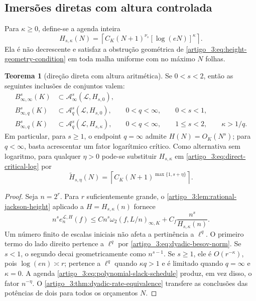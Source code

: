 \documentclass[12pt,a4paper]{article}
\theoremstyle{preciso}
\theoremstyle{definition}
\newcommand{\Library}{\mathcal{L}}
\theoremstyle{preciso}
\newtheorem{theorem}[teorema]{Teorema}
\theoremstyle{preciso}
\theoremstyle{preciso}
\theoremstyle{preciso}
\theoremstyle{definition}
\theoremstyle{preciso}
\theoremstyle{definition}
\theoremstyle{preciso}
\theoremstyle{preciso}
\theoremstyle{definition}
\begin{document}
\subsection{Imersões diretas com altura controlada}

Para $\kappa\ge0$, define-se a agenda inteira
\begin{equation}
 H_{s,\kappa}(N)
 =\left\lceil C_K(N+1)^{\nu_s}
        [\log(eN)]^\kappa\right\rceil.
 \label{artigo_3:eq:corrected-height-schedule}
\end{equation}
Ela é não decrescente e satisfaz a obstrução geométrica de
\eqref{artigo_3:eq:height-geometry-condition} em toda malha uniforme com no máximo
$N$ folhas.

\begin{theorem}[direção direta com altura aritmética]\label{map:artigo_3:4.2}
\label{artigo_3:thm:direct-besov-height}
Se $0<s<2$, então as seguintes inclusões de conjuntos valem:
\begin{align}
 B^s_{\infty,\infty}(K)
 &\subset
 \mathscr A^s_\infty(\Library,H_{s,0}),
 \label{artigo_3:eq:direct-endpoint}\\
 B^s_{\infty,q}(K)
 &\subset
 \mathscr A^s_q(\Library,H_{s,0}),
 &&0<q<\infty,\qquad 0<s<1,
 \label{artigo_3:eq:direct-subcritical}\\
 B^s_{\infty,q}(K)
 &\subset
 \mathscr A^s_q(\Library,H_{s,\kappa}),
 &&0<q<\infty,\qquad 1\le s<2,\qquad\kappa>1/q.
 \label{artigo_3:eq:direct-critical-log}
\end{align}
Em particular, para $s\ge1$, o endpoint $q=\infty$ admite
$H(N)=O_K(N^s)$; para $q<\infty$, basta acrescentar um fator logarítmico
crítico. Como
alternativa sem logaritmo, para qualquer $\eta>0$ pode-se substituir
$H_{s,\kappa}$ em \eqref{artigo_3:eq:direct-critical-log} por
\begin{equation}
 \widetilde H_{s,\eta}(N)
 =\left\lceil C_K(N+1)^{\max\{1,s+\eta\}}\right\rceil.
 \label{artigo_3:eq:polynomial-slack-schedule}
\end{equation}
\end{theorem}

\begin{proof}
Seja $n=2^r$. Para $r$ suficientemente grande, o
\cref{artigo_3:lem:rational-jackson-height} aplicado a
$H=H_{s,\kappa}(n)$ fornece
\begin{equation}
 n^s e_n^{\Library,H}(f)
 \le C n^s\omega_2(f,L/n)_{\infty,K}
     +C_f\frac{n^s}{H_{s,\kappa}(n)}.
 \label{artigo_3:eq:direct-sequence-bound}
\end{equation}
Um número finito de escalas iniciais não afeta a pertinência a $\ell^q$. O
primeiro termo do lado direito pertence a $\ell^q$ por
\eqref{artigo_3:eq:dyadic-besov-norm}. Se $s<1$, o segundo decai geometricamente como
$n^{s-1}$. Se $s\ge1$, ele é $O(r^{-\kappa})$, pois
$\log(en)\asymp r$; pertence a $\ell^q$ quando $\kappa q>1$ e é limitado
quando $q=\infty$ e $\kappa=0$. A agenda
\eqref{artigo_3:eq:polynomial-slack-schedule} produz, em vez disso, o fator
$n^{-\eta}$. O \cref{artigo_3:thm:dyadic-rate-equivalence} transfere as conclusões
das potências de dois para todos os orçamentos $N$.
\end{proof}
\end{document}
